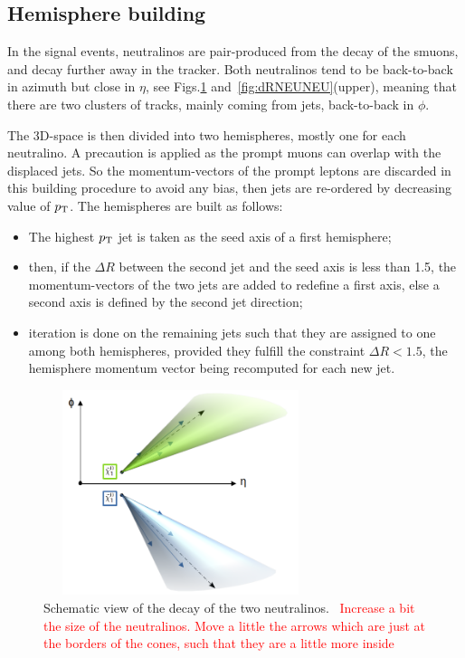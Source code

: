 \documentclass{cernatlasnote}
\newcommand{\pt}{$p_{\text T}$\xspace}
\begin{document}
\subsection{Hemisphere building}
In the signal events, neutralinos are pair-produced from the decay of the smuons, and decay further away in the tracker. Both neutralinos tend to be back-to-back in azimuth but close in $\eta$, see Figs.\ref{fig:Geometry} and~\ref{fig:dRNEUNEU}(upper), meaning that there are two clusters of tracks, mainly coming from jets, back-to-back in $\phi$. 

The 3D-space is then divided into two hemispheres, mostly one for each neutralino. A precaution is applied as the prompt muons can overlap with the displaced jets. So the momentum-vectors of the prompt leptons are discarded in this building procedure to avoid any bias, then jets are re-ordered by decreasing value of \pt. The hemispheres are built as follows: 
\begin{itemize}
    \item The highest \pt jet is taken as the seed axis of a first hemisphere;
    \item then, if the $\Delta R$ between the second jet and the seed axis is less than 1.5, the momentum-vectors of the two jets are added to redefine a first axis, else a second axis is defined by the second jet direction;
    \item iteration is done on the remaining jets such that they are assigned to one among both hemispheres, provided they fulfill the constraint $\Delta R < 1.5$, the hemisphere momentum vector being recomputed for each new jet.
\end{itemize}

\begin{figure}[h]
\centering
\includegraphics[height=6cm, width=8cm, trim= 0cm 0cm 0cm 0.cm,clip]{images/Topology/topo.png}
\caption{\label{fig:Geometry} Schematic view of the decay of the two neutralinos.
~\textcolor{red}{Increase a bit the size of the neutralinos. Move a little the arrows which are just at the borders of the cones, such that they are a little more inside}
}
\end{figure}
\end{document}

